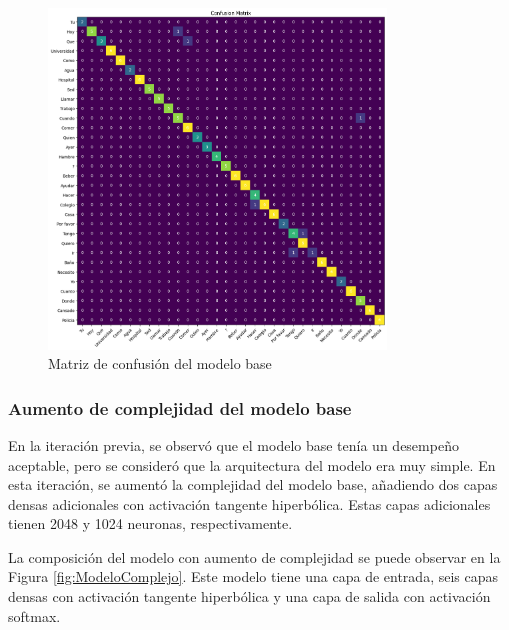\begin{figure}[H]
    \centering
    \includegraphics[width=0.8\textwidth]{figuras/baseModelCM.png}
    \caption{Matriz de confusión del modelo base}
    \label{fig:CMModeloInicial}
\end{figure}

\subsubsection{Aumento de complejidad del modelo base}
En la iteración previa, se observó que el modelo base tenía un desempeño aceptable, pero se consideró que la arquitectura del modelo era muy simple.
En esta iteración, se aumentó la complejidad del modelo base, añadiendo dos capas densas adicionales con activación tangente hiperbólica.
Estas capas adicionales tienen 2048 y 1024 neuronas, respectivamente.

La composición del modelo con aumento de complejidad se puede observar en la Figura \ref{fig:ModeloComplejo}.
Este modelo tiene una capa de entrada, seis capas densas con activación tangente hiperbólica y una capa de salida con activación softmax.

